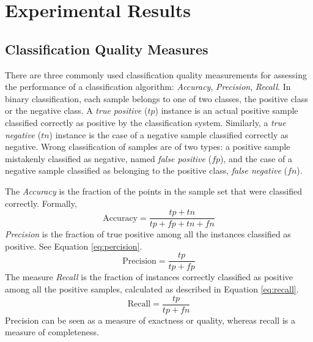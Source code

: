 \section{Experimental Results}
\label{sec:classification_results}

\subsection{Classification Quality Measures}
\iftoggle{edit-mode}{\hspace{0pt}\marginpar{Classification types}}{}
There are three commonly used classification quality measurements for assessing the performance of a classification algorithm: \emph{Accuracy}, \emph{Precision}, \emph{Recall}.
In binary classification, each sample belongs to one of two classes, the positive class or the negative class.
A \emph{true positive} ($tp$) instance is an actual positive sample classified correctly as positive by the classification system.
Similarly, a \emph{true negative} ($tn$) instance is the case of a negative sample classified correctly as negative.  
Wrong classification of samples are of two types: a positive sample mistakenly classified as negative, named \emph{false positive} ($fp$), and the case of a negative sample classified as belonging to the positive class, \emph{false negative} ($fn$). 

\iftoggle{edit-mode}{\hspace{0pt}\marginpar{Classification quality measurements - binary}}{}
The \emph{Accuracy} is the fraction of the points in the sample set that were classified correctly. 
Formally,
\begin{equation}
\text{Accuracy}=\frac{tp+tn}{tp+fp+tn+fn}
\label{eq:accuracy}
\end{equation}
\emph{Precision} is the fraction of true positive among all the instances classified as positive. 
See Equation \ref{eq:percision}.
\begin{equation}
\text{Precision}=\frac{tp}{tp+fp}
\label{eq:percision}
\end{equation}
The measure \emph{Recall} is the fraction of instances correctly classified as positive among all the positive samples, calculated as described in Equation \ref{eq:recall}.
\begin{equation}
\text{Recall}=\frac{tp}{tp+fn}  
\label{eq:recall}
\end{equation}
Precision can be seen as a measure of exactness or quality, whereas recall is a measure of completeness.

